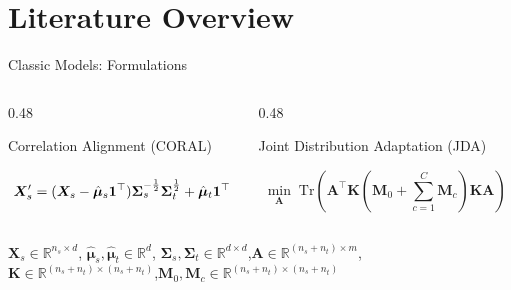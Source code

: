 \documentclass[aspectratio=169]{beamer}
\providecommand{\mat}[1]{{\bm{#1}}}
\providecommand{\ve}[1]{{\bm{#1}}}
\begin{document}
\section[Literature Overview]{Literature Overview}

\begin{frame}{Classic Models: Formulations}
    
    \begin{columns}[T] %
        
        \begin{column}{0.48\textwidth}
            \begin{block}{Correlation Alignment (CORAL)}
                \begin{minipage}{\linewidth}
                \begin{equation*}
                    \vphantom{\sum_{c=1}^C}
                     \mat{X}_s' = (\mat{X}_s - \hat{\ve{\mu}}_s \mathbf{1}^\top) \mat{\Sigma}_s^{-\frac{1}{2}} \mat{\Sigma}_t^{\frac{1}{2}} + \hat{\ve{\mu}}_t \ve{1}^\top
                \end{equation*}
                \end{minipage}
            \end{block}
        \end{column}
        
        \hfill
        
        \begin{column}{0.48\textwidth}
            \begin{block}{Joint Distribution Adaptation (JDA)}
                \begin{minipage}{\linewidth}
                 \begin{equation*}
                    \min_{\mat{A}} \; \text{Tr}\left(\mat{A}^\top \mat{K} \left( \mat{M}_0 + \sum_{c=1}^C \mat{M}_c \right) \mat{K} \mat{A} \right)
                \end{equation*}
                \end{minipage}
            \end{block}
        \end{column}
        
    \end{columns}
    
    \vspace{1cm} 
    $\mat{X}_s \in \mathbb{R}^{n_s \times d}$, $\hat{\ve{\mu}}_s, \hat{\ve{\mu}}_t \in \mathbb{R}^d$, $\mat{\Sigma}_s, \mat{\Sigma}_t \in \mathbb{R}^{d \times d}$,$\mat{A} \in \mathbb{R}^{(n_s+n_t) \times m}$, $\mat{K} \in \mathbb{R}^{(n_s+n_t)\times(n_s+n_t)}$,$\mat{M}_0, \mat{M}_c \in \mathbb{R}^{(n_s+n_t)\times(n_s+n_t)}$
\end{frame}
\end{document}
